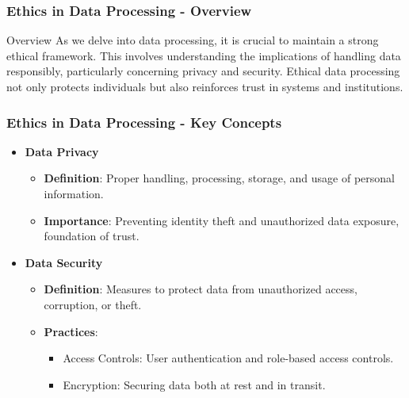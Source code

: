 \documentclass[aspectratio=169]{beamer}
\begin{document}
\begin{frame}[fragile]
    \frametitle{Ethics in Data Processing - Overview}
    \begin{block}{Overview}
        As we delve into data processing, it is crucial to maintain a strong ethical framework. 
        This involves understanding the implications of handling data responsibly, particularly concerning privacy and security. 
        Ethical data processing not only protects individuals but also reinforces trust in systems and institutions.
    \end{block}
\end{frame}

\begin{frame}[fragile]
    \frametitle{Ethics in Data Processing - Key Concepts}
    \begin{itemize}
        \item \textbf{Data Privacy}
            \begin{itemize}
                \item \textbf{Definition}: Proper handling, processing, storage, and usage of personal information.
                \item \textbf{Importance}: Preventing identity theft and unauthorized data exposure, foundation of trust.
            \end{itemize}
        \item \textbf{Data Security}
            \begin{itemize}
                \item \textbf{Definition}: Measures to protect data from unauthorized access, corruption, or theft.
                \item \textbf{Practices}:
                    \begin{itemize}
                        \item Access Controls: User authentication and role-based access controls.
                        \item Encryption: Securing data both at rest and in transit.
                    \end{itemize}
            \end{itemize}
    \end{itemize}
\end{frame}
\end{document}
